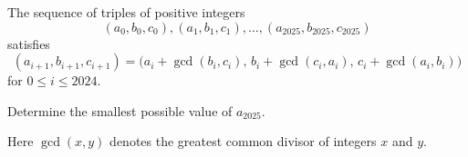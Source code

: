 The sequence of triples of positive integers
\[
(a_0,b_0,c_0),(a_1,b_1,c_1),\ldots,(a_{2025},b_{2025},c_{2025})
\]
satisfies
\[
(a_{i+1},b_{i+1},c_{i+1})
=\bigl(a_i+\gcd(b_i,c_i),\,b_i+\gcd(c_i,a_i),\,c_i+\gcd(a_i,b_i)\bigr)
\]
for $0\leq i\leq 2024$.

Determine the smallest possible value of $a_{2025}$.

Here $\gcd(x,y)$ denotes the greatest common divisor of integers $x$ and $y$.
